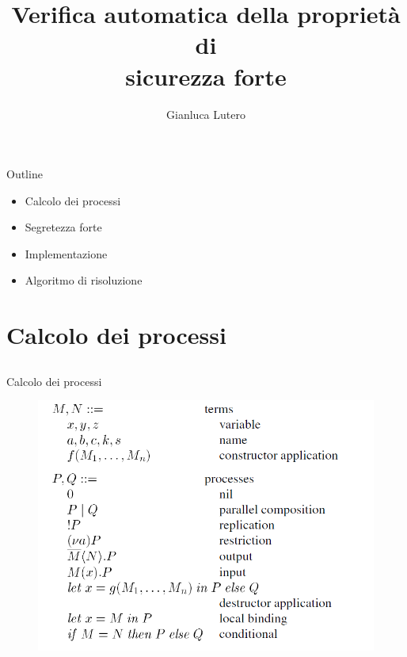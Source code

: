 \documentclass[11pt,xcolor=table]{beamer}
\title{Verifica automatica della proprietà di\\ sicurezza forte}
\author{Gianluca Lutero}
\institute{Alma Mater Studiorum Bologna\\Crittografia}
\date{}
\begin{document}
\begin{frame}{}
    \maketitle
\end{frame}

\begin{frame}{Outline}
    \begin{itemize}
        \item Calcolo dei processi
        \item Segretezza forte
        \item Implementazione
        \item Algoritmo di risoluzione
    \end{itemize}
\end{frame}

\section{Calcolo dei processi}
\subsection{}
\begin{frame}{Calcolo dei processi}
    \begin{figure}[h]
        \centering
        \includegraphics[scale=0.5]{Relazione/Immagini/calcolo.PNG}
    \end{figure}
\end{frame}
\end{document}
